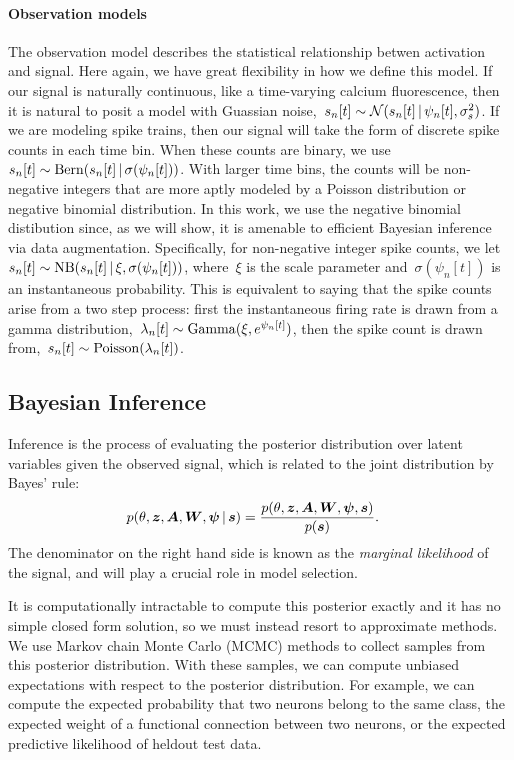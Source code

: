 \paragraph{Observation models}
The observation model describes the statistical relationship betwen activation and signal. 
Here again, we have great flexibility in how we define this model.
If our signal is naturally continuous, like a time-varying calcium fluorescence, then it is natural to posit a model with Guassian noise,~${s_n[t] \sim \mathcal{N}(s_n[t] \,|\, \psi_n[t], \sigma_s^2)}$. 
If we are modeling spike trains, then our signal will take the form of discrete spike counts in each time bin.
When these counts are binary, we use~${s_n[t] \sim \mathrm{Bern}(s_n[t] \,|\, \sigma(\psi_n[t]))}$.
With larger time bins, the counts will be non-negative integers that are more aptly modeled by a Poisson distribution or negative binomial distribution. 
In this work, we use the negative binomial distibution since, as we will show, it is amenable to efficient Bayesian inference via data augmentation. 
Specifically, for non-negative integer spike counts, we let~${s_n[t] \sim \mathrm{NB}(s_{n}[t] \,|\, \xi, \sigma(\psi_n[t]))}$,
where~$\xi$ is the scale parameter and~$\sigma(\psi_n[t])$ is an instantaneous probability. 
This is equivalent to saying that the spike counts arise from a two step process: 
first the instantaneous firing rate is drawn from a gamma distribution,~$\lambda_n[t] \sim \mathrm{Gamma}(\xi, e^{\psi_{n}[t]})$, then the spike count is drawn from,~$s_{n}[t]\sim \mathrm{Poisson}(\lambda_n[t])$.

\subsection{Bayesian Inference}
Inference is the process of evaluating the posterior distribution over latent variables given the observed signal, which is related to the joint distribution by Bayes' rule:
\begin{align}
p(\theta, \boldsymbol{z}, \boldsymbol{A}, \boldsymbol{W}, \boldsymbol{\psi} \,|\, \boldsymbol{s}) &= \frac{p(\theta, \boldsymbol{z}, \boldsymbol{A}, \boldsymbol{W}, \boldsymbol{\psi}, \boldsymbol{s}) }{p(\boldsymbol{s})}.
\end{align}
The denominator on the right hand side is known as the \emph{marginal likelihood} of the signal, and will play a crucial role in model selection. 

It is computationally intractable to compute this posterior exactly and it has no simple closed form solution, so we must instead resort to approximate methods. 
We use Markov chain Monte Carlo (MCMC) methods to collect samples from this posterior distribution.
With these samples, we can compute unbiased expectations with respect to the posterior distribution.
For example, we can compute the expected probability that two neurons belong to the same class, the expected weight of a functional connection between two neurons, or the expected predictive likelihood of heldout test data.

